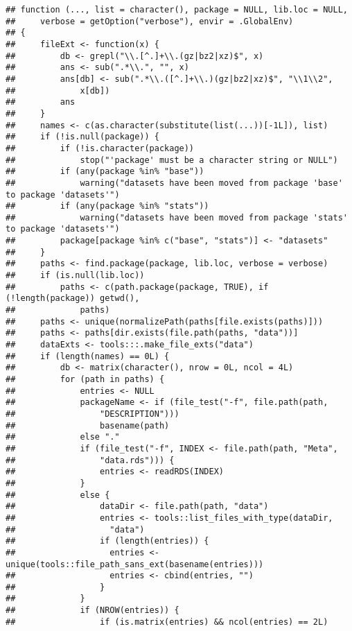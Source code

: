 \documentclass[]{article}
\begin{document}
\begin{verbatim}
## function (..., list = character(), package = NULL, lib.loc = NULL, 
##     verbose = getOption("verbose"), envir = .GlobalEnv) 
## {
##     fileExt <- function(x) {
##         db <- grepl("\\.[^.]+\\.(gz|bz2|xz)$", x)
##         ans <- sub(".*\\.", "", x)
##         ans[db] <- sub(".*\\.([^.]+\\.)(gz|bz2|xz)$", "\\1\\2", 
##             x[db])
##         ans
##     }
##     names <- c(as.character(substitute(list(...))[-1L]), list)
##     if (!is.null(package)) {
##         if (!is.character(package)) 
##             stop("'package' must be a character string or NULL")
##         if (any(package %in% "base")) 
##             warning("datasets have been moved from package 'base' to package 'datasets'")
##         if (any(package %in% "stats")) 
##             warning("datasets have been moved from package 'stats' to package 'datasets'")
##         package[package %in% c("base", "stats")] <- "datasets"
##     }
##     paths <- find.package(package, lib.loc, verbose = verbose)
##     if (is.null(lib.loc)) 
##         paths <- c(path.package(package, TRUE), if (!length(package)) getwd(), 
##             paths)
##     paths <- unique(normalizePath(paths[file.exists(paths)]))
##     paths <- paths[dir.exists(file.path(paths, "data"))]
##     dataExts <- tools:::.make_file_exts("data")
##     if (length(names) == 0L) {
##         db <- matrix(character(), nrow = 0L, ncol = 4L)
##         for (path in paths) {
##             entries <- NULL
##             packageName <- if (file_test("-f", file.path(path, 
##                 "DESCRIPTION"))) 
##                 basename(path)
##             else "."
##             if (file_test("-f", INDEX <- file.path(path, "Meta", 
##                 "data.rds"))) {
##                 entries <- readRDS(INDEX)
##             }
##             else {
##                 dataDir <- file.path(path, "data")
##                 entries <- tools::list_files_with_type(dataDir, 
##                   "data")
##                 if (length(entries)) {
##                   entries <- unique(tools::file_path_sans_ext(basename(entries)))
##                   entries <- cbind(entries, "")
##                 }
##             }
##             if (NROW(entries)) {
##                 if (is.matrix(entries) && ncol(entries) == 2L) 

\end{verbatim}
\end{document}
